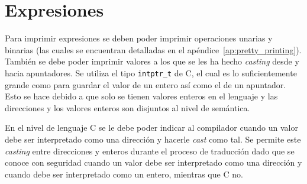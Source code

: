 \begin{comment}
donde $base$ es el primer componente de una dirección con la que se accede al bloque y $contenido\_bloque$ es la representación en cadena de caracteres del contenido en el bloque número $base$.

Para imprimir la memoria completa se hace \verb|show| de cada bloque existente en memoria.
Por ejemplo, la representación en cadena de caracteres del estado de memoria: $[\mathtt{Some}\ [\mathtt{I}\ 13,\ \mathtt{None}],\ None,\ \mathtt{Some}\ [\mathtt{A}(2,3),\ None, \mathtt{I}\ 56]]$ sería:

\begin{align*}
0\ &:\ [13,\ ?] \\
1\ &:\ <free> \\
2\ &:\ [2[3],\ ?,\ 56]
\end{align*}
\end{comment}


\section{Expresiones}

Para imprimir expresiones se deben poder imprimir operaciones unarias y binarias (las cuales se encuentran detalladas en el apéndice~\ref{ap:pretty_printing}).
También se debe poder imprimir valores a los que se les ha hecho \textit{casting} desde y hacia apuntadores.
Se utiliza el tipo \verb|intptr_t| de C, el cual es lo suficientemente grande como para guardar el valor de un entero así como el de un apuntador.
Esto se hace debido a que solo se tienen valores enteros en el lenguaje y las direcciones y los valores enteros son disjuntos al nivel de semántica.

En el nivel de lenguaje C se le debe poder indicar al compilador cuando un valor debe ser interpretado como una dirección y hacerle \textit{cast} como tal.
Se permite este \textit{casting} entre direcciones y enteros durante el proceso de traducción dado que se conoce con seguridad cuando un valor debe ser interpretado como una dirección y cuando debe ser interpretado como un entero, mientras que C no.

